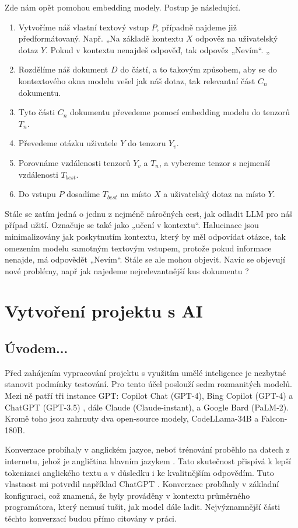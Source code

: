 \documentclass[FM,DP]{tulthesis}
\begin{document}
		Zde nám opět pomohou embedding modely. Postup je následující.
		\begin{enumerate}
			\item Vytvoříme náš vlastní textový vstup $P$, případně najdeme již předformátovaný. Např. „Na základě kontextu $X$ odpověz na uživatelský dotaz $Y$. Pokud v kontextu nenajdeš odpověď, tak odpověz „Nevím“. „
			\item Rozdělíme náš dokument $D$ do částí, a to takovým způsobem, aby se do kontextového okna modelu vešel jak náš dotaz, tak relevantní část $C_n$ dokumentu.
			\item Tyto části $C_n$ dokumentu převedeme pomocí embedding modelu do tenzorů $T_n$.
			\item Převedeme otázku uživatele $Y$ do tenzoru $Y_v$.
			\item Porovnáme vzdálenosti tenzorů $Y_v$ a $T_n$, a vybereme tenzor s nejmenší vzdálenosti $T_{best}$. 
			\item Do vstupu $P$ dosadíme $T_{best}$ na místo $X$ a uživatelský dotaz na místo $Y$.
		\end{enumerate}
		
		Stále se zatím jedná o jednu z nejméně náročných cest, jak odladit LLM pro náš případ užití. Označuje se také jako „učení v kontextu“. Halucinace jsou minimalizovány jak poskytnutím kontextu, který by měl odpovídat otázce, tak omezením modelu samotným textovým vstupem, protože pokud informace nenajde, má odpovědět „Nevím“. Stále se ale mohou objevit. Navíc se objevují nové problémy, např jak najedeme nejrelevantnější kus dokumentu \cite{paper:RAG}?
		
		\chapter{Vytvoření projektu s AI}
		\section{Úvodem...}
		Před zahájením vypracování projektu s využitím umělé inteligence je nezbytné stanovit podmínky testování. Pro tento účel poslouží sedm rozmanitých modelů. Mezi ně patří tři instance GPT: Copilot Chat (GPT-4), Bing Copilot (GPT-4) a ChatGPT (GPT-3.5) , dále Claude (Claude-instant), a Google Bard (PaLM-2). Kromě toho jsou zahrnuty dva open-source modely, CodeLLama-34B a Falcon-180B.
		
		Konverzace probíhaly v anglickém jazyce, neboť trénování proběhlo na datech z internetu, jehož je angličtina hlavním jazykem \cite{internetLanguages}. Tato skutečnost přispívá k lepší tokenizaci anglického textu a v důsledku i ke kvalitnějším odpovědím. Tuto vlastnost mi potvrdil například ChatGPT \cite{chatgpt_jazyk}. Konverzace probíhaly v základní konfiguraci, což znamená, že byly prováděny v kontextu průměrného programátora, který nemusí tušit, jak model dále ladit. Nejvýznamnější části těchto konverzací budou přímo citovány v práci. 
		
\end{document}
